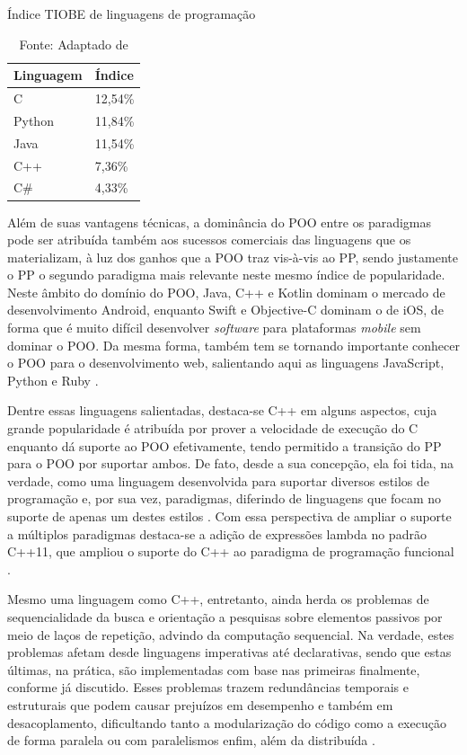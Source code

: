 \begin{table}[!htb]
  \centering
  \caption{Índice TIOBE de linguagens de programação}
  \smallskip
  \begin{tabularx}{0.3\textwidth}{|X|l|}
    \hline
    Linguagem & Índice  \\
    \hline
    C         & 12,54\% \\
    \hline
    Python    & 11,84\% \\
    \hline
    Java      & 11,54\% \\
    \hline
    C++       & 7,36\%  \\
    \hline
    C\#       & 4,33\%  \\
    \hline
  \end{tabularx}
  \caption*{Fonte: Adaptado de }
  \label{tab:linguagens}

\end{table}

Além de suas vantagens técnicas, a dominância do POO entre os paradigmas pode
ser atribuída também aos sucessos comerciais das linguagens que os materializam,
à luz dos ganhos que a POO traz vis-à-vis ao PP, sendo justamente o PP o segundo
paradigma mais relevante neste mesmo índice de popularidade. Neste âmbito  do
domínio do POO, Java, C++ e Kotlin dominam o mercado de desenvolvimento Android,
enquanto Swift e Objective-C dominam o de iOS, de forma que é muito difícil
desenvolver \textit{software} para plataformas \textit{mobile} sem dominar o
POO. Da mesma forma, também tem se tornando importante conhecer o POO para o
desenvolvimento web, salientando aqui as linguagens JavaScript, Python e Ruby
\cite{gwosdz_2020}.

Dentre essas linguagens salientadas, destaca-se C++ em alguns aspectos, cuja
grande popularidade é atribuída por prover a velocidade de execução do C
enquanto dá suporte ao POO efetivamente, tendo permitido a transição do
PP para o POO por suportar ambos. De fato, desde a sua concepção, ela foi tida,
na verdade, como uma linguagem desenvolvida para suportar diversos estilos de
programação e, por sua vez, paradigmas, diferindo de linguagens que focam no
suporte de apenas um destes estilos \cite{bjarne_1995}. Com essa perspectiva de
ampliar o suporte a múltiplos paradigmas destaca-se a adição de expressões
lambda no padrão C++11, que ampliou o suporte do C++ ao paradigma de programação
funcional \cite{bjarne_2020}.

Mesmo uma linguagem como C++, entretanto, ainda herda os problemas de
sequencialidade da busca e orientação a pesquisas sobre elementos passivos por
meio de laços de repetição, advindo da computação sequencial. Na verdade, estes
problemas afetam desde linguagens imperativas até declarativas, sendo que estas
últimas, na prática, são implementadas com base nas primeiras finalmente,
conforme já discutido. Esses problemas trazem redundâncias temporais e
estruturais que podem causar prejuízos em desempenho e também em desacoplamento,
dificultando tanto a modularização do código como a execução de forma paralela
ou com paralelismos enfim, além da distribuída
\cite{simao_2009,simao_2012a,doc_ronszcka_2019}.

